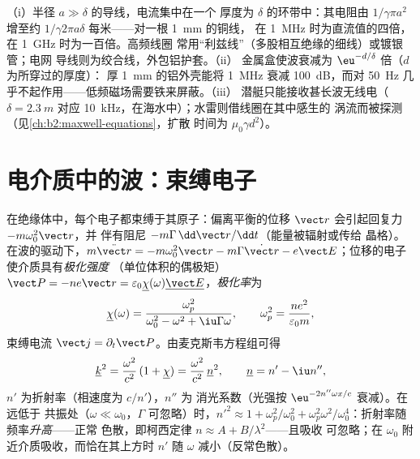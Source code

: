 \begin{example}[趋肤效应的应用]\label{ex:b2:waves-in-media:skinuses}
（i）半径 $a \gg \delta$ 的导线，电流集中在一个
厚度为 $\delta$ 的环带中：其电阻由 $1/\gamma\pi a^2$ 增至约 $1/\gamma
2\pi a\delta$ 每米——对一根 \qty{1}{mm} 的铜线，
在 \qty{1}{MHz} 时为直流值的四倍，在 \qty{1}{GHz} 时为一百倍。高频线圈
常用“利兹线”（多股相互绝缘的细线）或镀银管；电网
导线则为绞合线，外包铝护套。（ii）
金属盒使波衰减为 $\eu^{-d/\delta}$ 倍（$d$ 为所穿过的厚度）：
厚 \qty{1}{mm} 的铝外壳能将 \qty{1}{MHz} 衰减 \qty{100}{dB}，而对 \qty{50}{Hz}
几乎不起作用——低频磁场需要铁来屏蔽。（iii）
潜艇只能接收甚长波无线电（$\delta = \qty{2.3}{m}$ 对应
\qty{10}{kHz}，在海水中）；水雷则借线圈在其中感生的
涡流而被探测（见\cref{ch:b2:maxwell-equations}，扩散
时间为 $\mu_0\gamma d^2$）。
\end{example}

\section{电介质中的波：束缚电子}

\begin{proposition}\label{prop:b2:waves-in-media:lorentz}
在绝缘体中，每个电子都束缚于其原子：偏离平衡的位移
$\vect r$ 会引起回复力 $-m\omega_0^2\vect r$，并
伴有阻尼 $-m\Gamma\,\dd\vect r/\dd t$（能量被辐射或传给
晶格）。在波的驱动下，$m\ddot{\vect r} = -m\omega_0^2\vect r - m\Gamma\dot{\vect r}
- e\vect E$；位移的电子使介质具有\emph{极化强度}
（单位体积的偶极矩）$\vect P = -ne\vect r = \varepsilon_0\underline\chi(\omega)
\underline{\vect E}$，\emph{极化率}为
\[
\underline\chi(\omega) = \frac{\omega_p^2}{\omega_0^2 - \omega^2 + \iu\Gamma\omega} ,
\qquad \omega_p^2 = \frac{ne^2}{\varepsilon_0m} ,
\]
束缚电流 $\vect j = \partial_t\vect P$。由麦克斯韦方程组可得
\[
\underline k^2 = \frac{\omega^2}{c^2}\,(1 + \underline\chi) = \frac{\omega^2}{c^2}\,\underline n^2 ,
\qquad \underline n = n' - \iu n'' ,
\]
$n'$ 为折射率（相速度为 $c/n'$），$n''$ 为
消光系数（光强按 $\eu^{-2n''\omega x/c}$ 衰减）。在远低于
共振处（$\omega \ll \omega_0$，$\Gamma$ 可忽略）时，$n'^2 \approx 1 + \omega_p^2/\omega_0^2 +
\omega_p^2\omega^2/\omega_0^4$：折射率随频率\emph{升高}——正常
色散，即柯西定律 $n \approx A + B/\lambda^2$——且吸收
可忽略；在 $\omega_0$ 附近介质吸收，而恰在其上方时 $n'$
随 $\omega$ 减小（反常色散）。
\end{proposition}

